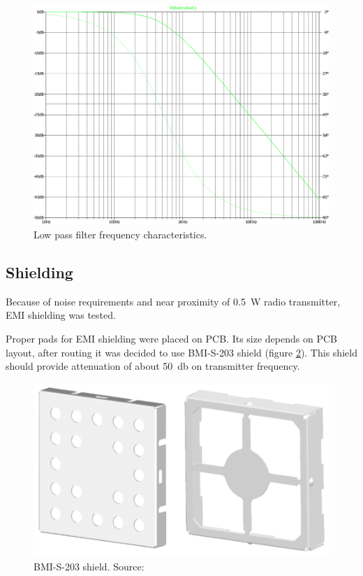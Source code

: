         \begin{figure}[H]
            \centering
            \includegraphics[width=0.7\paperwidth]{img/06/low_pass_filter_output.eps}
            \caption{Low pass filter frequency characteristics.}
            \label{low_pass_filter_output}
        \end{figure}

    \subsection{Shielding}
        Because of noise requirements and near proximity of \SI{0.5}{\watt} radio transmitter, EMI shielding was tested.

        Proper pads for EMI shielding were placed on PCB. Its size depends on PCB layout, after routing it was decided to use BMI-S-203 shield (figure \ref{BMI-S-203}). This shield should provide attenuation of about \SI{50}{\decibel} on transmitter frequency.

        \begin{figure}[H]
            \centering
            \includegraphics[width=0.7\paperwidth]{img/06/BMI-S-203.eps}
            \caption{BMI-S-203 shield. Source: \cite{EMI_shieldings_catalog}}
            \label{BMI-S-203}
        \end{figure}


